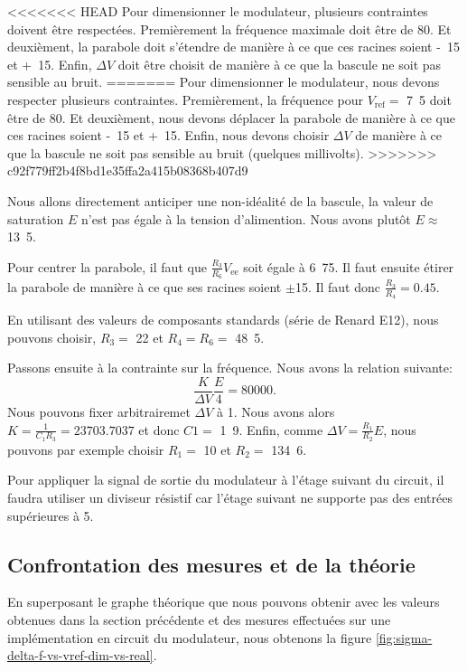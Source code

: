 <<<<<<< HEAD
Pour dimensionner le modulateur, plusieurs contraintes doivent
être respectées. Premièrement la fréquence maximale doit être
de \unit{80}{\kilo\hertz}. Et deuxièment, la parabole doit s'étendre
de manière à ce que ces racines soient \unit{-15}{\volt} et
\unit{+15}{\volt}. Enfin, $\Delta V$ doit être choisit de manière
à ce que la bascule ne soit pas sensible au bruit.
=======
Pour dimensionner le modulateur, nous devons respecter plusieurs
contraintes. Premièrement, la fréquence pour $V_{\text{ref}} =$
\unit{7.5}{\volt} doit être de \unit{80}{\kilo\hertz}. Et deuxièment,
nous devons déplacer la parabole
de manière à ce que ces racines soient \unit{-15}{\volt} et
\unit{+15}{\volt}. Enfin, nous devons choisir $\Delta V$ de manière
à ce que la bascule ne soit pas sensible au bruit (quelques millivolts).
>>>>>>> c92f779ff2b4f8bd1e35ffa2a415b08368b407d9

Nous allons directement anticiper une non-idéalité de la bascule,
la valeur de saturation $E$ n'est pas égale à la tension
d'alimention. Nous avons plutôt $E \approx$ \unit{13.5}{\volt}.

Pour centrer la parabole, il faut que $\frac{R_3}{R_6}V_{\text{ee}}$
soit égale à \unit{6.75}{\volt}. Il faut ensuite étirer la
parabole de manière à ce que ses racines soient $\pm$\unit{15}{\volt}.
Il faut donc $\frac{R_3}{R_4} = 0.45$. 

En utilisant des valeurs de composants standards (série de Renard E12), 
nous pouvons choisir, $R_3 =$ \unit{22}{\kilo\ohm} et $R_4 = R_6 =
$ \unit{48.5}{\kilo\ohm}.

Passons ensuite à la contrainte sur la fréquence. Nous avons la 
relation suivante:
\[ \frac{K}{\Delta V}\frac{E}{4} = 80000.\]
Nous pouvons fixer arbitrairemet $\Delta V$ à \unit{1}{\volt}. Nous avons alors
$K = \frac{1}{C_1R_3} = 23703.7037$ et donc $C1 =$ \unit{1.9}{\nano\farad}.
Enfin, comme $\Delta V = \frac{R_1}{R_2}E$, nous pouvons par exemple
choisir $R_1 =$ \unit{10}{\kilo\ohm} et $R_2 =$ \unit{134.6}{\kilo\ohm}.


Pour appliquer la signal de sortie du modulateur
à l'étage suivant du circuit, il faudra utiliser un diviseur
résistif car l'étage suivant ne supporte pas des entrées supérieures
à \unit{5}{\volt}.

\subsection{Confrontation des mesures et de la théorie}
En superposant le graphe théorique que nous pouvons obtenir avec les valeurs
obtenues dans la section précédente
et des mesures effectuées sur une implémentation en circuit
du modulateur, nous obtenons la figure \ref{fig:sigma-delta-f-vs-vref-dim-vs-real}.

